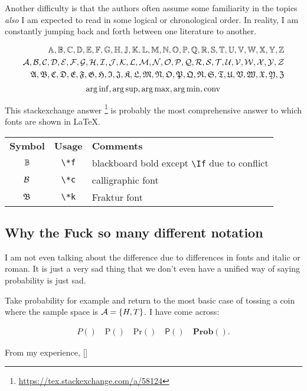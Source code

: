 Another difficulty is that  the authors often assume some familiarity in the topics
\textit{also} I am expected to read in some logical or chronological order.
In reality, I am constantly jumping back and forth between one literature to another.

\begin{align*}
    \Af, \Bf, \Cf, \Df, \Ef, \Ff, \Gf, \Hf, \Jf, \Kf, \Lf, \Mf, \Nf, \Of, \Pf, \Qf, \Rf, \Sf, \Tf, \Uf, \Vf, \Wf, \Xf, \Yf, \Zf      \\
    \Ac, \Bc, \Cc, \Dc, \Ec, \Fc, \Gc, \Hc, \Ic, \Jc, \Kc, \Lc, \Mc, \Nc, \Oc, \Pc, \Qc, \Rc, \Sc, \Tc, \Uc, \Vc, \Wc, \Xc, \Yc, \Zc \\
    \Ak, \Bk, \Ck, \Dk, \Ek, \Fk, \Gk, \Hk, \Ik, \Jk, \Kk, \Lk, \Mk, \Nk, \Ok, \Pk, \Qk, \Rk, \Sk, \Tk, \Uk, \Vk, \Wk, \Xk, \Yk, \Zk
\end{align*}
$$
    \operatorname*{arg\, inf}, \operatorname*{arg\, sup}, \operatorname*{arg\, max}, \operatorname*{arg\, min}, \mathrm{conv}
$$

This stackexchange answer \footnote{\url{https://tex.stackexchange.com/a/58124}}
is probably the most comprehensive answer to which fonts are shown in \LaTeX.

\begin{table}[h!]
    \centering\renewcommand{\arraystretch}{1.2}
    \begin{tabular}{ccl}
        \textbf{Symbol} & \textbf{Usage} & \textbf{Comments}                                 \\
        $\mathbb{B}$           & \verb|\*f|     & blackboard bold except \verb|\If| due to conflict \\
        $\mathcal{B}$           & \verb|\*c|     & calligraphic font                                 \\
        $\mathfrak{B}$           & \verb|\*k|     & Fraktur font                                      \\
    \end{tabular}
    \label{tab:macro-letters}
\end{table}


\subsection{Why the Fuck so many different notation}

I am not even talking about the difference due to differences in fonts and italic or roman.
It is just a very sad thing that we don't even have a unified way of saying probability is just sad.

Take probability for example and return to the most basic case of tossing a coin 
where the sample space is $\mathcal{A} = \{H, T\}$. I have come across:

\begin{align*}
    P() \quad \mathrm{P}() \quad \mathrm{Pr}() \quad \mathsf{P}() \quad \mathbf{Prob}().
\end{align*}

From my experience, []